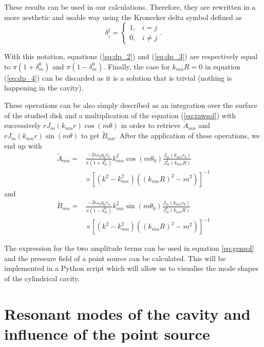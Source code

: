 \documentclass[%
 reprint,
 amsmath,amssymb,
 aps,
]{revtex4-2}
\begin{document}
These results can be used in our calculations. Therefore, they are rewritten in a more aesthetic and usable way using the Kronecker delta symbol defined as 
\begin{equation}
   \delta_i^j = \begin{cases}
       1, & i = j\\ 0, & i \ne j
   \end{cases}.
\end{equation}

With this notation, equations (\ref{eq:dp_2}) and (\ref{eq:dp_3}) are respectively equal to $\pi(1 + \delta_m^0)$ and $\pi(1 - \delta_m^0)$. Finally, the case for $k_{mn}R = 0$ in equation (\ref{eq:dp_4}) can be discarded as it is a solution that is trivial (nothing is happening in the cavity).

These operations can be also simply described as an integration over the surface of the studied disk and a multiplication of the equation (\ref{eq:rawsol}) with successively $r J_m(k_{mn}r) \cos(m\theta)$ in order to retrieve $\tilde{A}_{mn}$ and $r J_m(k_{mn}r) \sin(m\theta)$ to get $\tilde{B}_{mn}$. After the application of these operations, we end up with
\begin{equation}
    \begin{split}
        \tilde{A}_{mn} =& \frac{- 2 i \omega_0 q_0 r_0}{\pi (1 + \delta_m^0)} k_{mn}^2  \cos(m \theta_0) \frac{J_m(k_{mn}r_0)}{J^2_m(k_{mn}R)}\\ &\times\left[(k^2 - k^2_{mn}) ((k_{mn}R)^2 - m^2)\right]^{-1}
    \end{split}
\end{equation}
and 
\begin{equation}
    \begin{split}
        \tilde{B}_{mn} =& \frac{- 2 i \omega_0 q_0 r_0}{\pi (1 - \delta_m^0)} k_{mn}^2  \sin(m \theta_0) \frac{J_m(k_{mn}r_0)}{J^2_m(k_{mn}R)}\\ &\times\left[(k^2 - k^2_{mn}) ((k_{mn}R)^2 - m^2)\right]^{-1}
    \end{split}
\end{equation}

The expression for the two amplitude terms can be used in equation \ref{eq:gensol} and the pressure field of a point source can be calculated. This will be implemented in a Python script which will allow us to visualise the mode shapes of the cylindrical cavity. %

\section{Resonant modes of the cavity and influence of the point source}
\end{document}
